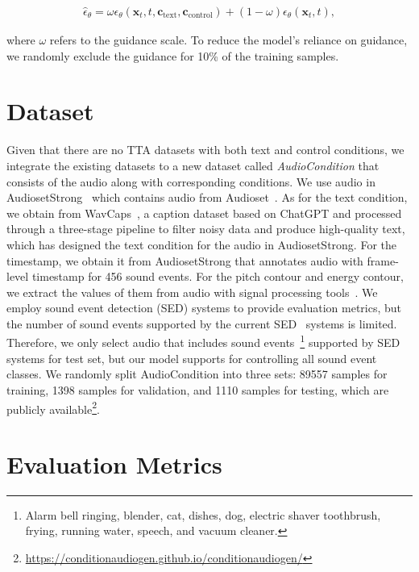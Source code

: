 \documentclass[letterpaper]{article} %
\begin{document}
\begin{align}
\hat{\epsilon}_{\theta} = \omega\epsilon_{\theta}(\mathbf{x}_{t}, t, \mathbf{c}_{\text{text}}, \mathbf{c}_{\text{control}}) + (1 - \omega)\epsilon_{\theta}(\mathbf{x}_{t}, t),
\end{align}

where $\omega$ refers to the guidance scale. To reduce the model's reliance on guidance, we randomly exclude the guidance for 10\% of the training samples.

\section{Dataset}

Given that there are no TTA datasets with both text and control conditions, we integrate the existing datasets to a new dataset called \textit{AudioCondition} that consists of the audio along with corresponding conditions. We use audio in AudiosetStrong~\cite{hershey2021audiosetstrong} which contains audio from Audioset~\cite{gemmeke2017audioset}. As for the text condition, we obtain from WavCaps~\cite{mei2023wavecaps}, a caption dataset based on ChatGPT and processed through a three-stage pipeline to filter noisy data and produce high-quality text, which has designed the text condition for the audio in AudiosetStrong. For the timestamp, we obtain it from AudiosetStrong that annotates audio with frame-level timestamp for 456 sound events. For the pitch contour and energy contour, we extract the values of them from audio with signal processing tools~\cite{world2016morise,librosa2015masanori}. We employ sound event detection (SED) systems to provide evaluation metrics, but the number of sound events supported by the current SED~\cite{janek2021sased, janek2020fbsedt, janek2022pssed} systems is limited. Therefore, we only select audio that includes sound events~\footnote{Alarm bell ringing, blender, cat, dishes, dog, electric shaver toothbrush, frying, running water, speech, and vacuum cleaner.}
supported by SED systems for test set, but our model supports for controlling all sound event classes. We randomly split AudioCondition into three sets: 89557 samples for training, 1398 samples for validation, and 1110 samples for testing, which are publicly available\footnote{\url{https://conditionaudiogen.github.io/conditionaudiogen/}}.

\section{Evaluation Metrics}
\end{document}
